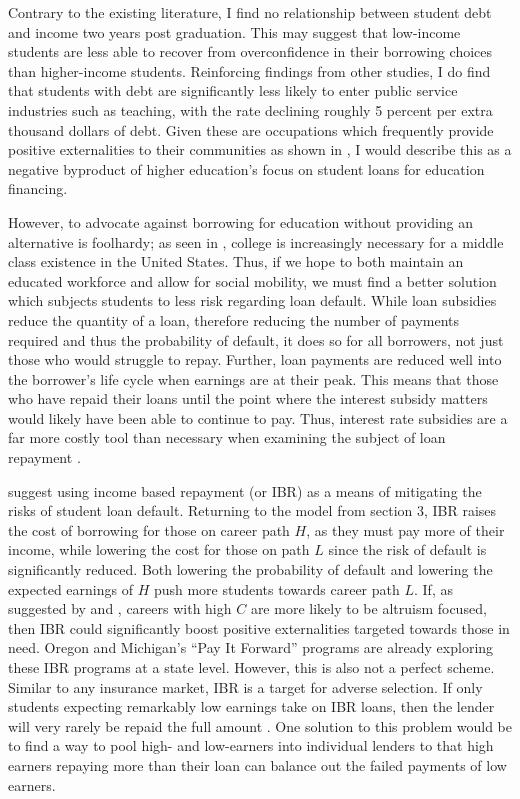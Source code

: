 \documentclass[12pt]{article}
\begin{document}
	Contrary to the existing literature, I find no relationship between student debt and income two years post graduation. This may suggest that low-income students are less able to recover from overconfidence in their borrowing choices than higher-income students. Reinforcing findings from other studies, I do find that students with debt are significantly less likely to enter public service industries such as teaching, with the rate declining roughly 5 percent per extra thousand dollars of debt. Given these are occupations which frequently provide positive externalities to their communities as shown in \textcite{benshem1991}, I would describe this as a negative byproduct of higher education's focus on student loans for education financing.
	
	However, to advocate against borrowing for education without providing an alternative is foolhardy; as seen in \textcite{abel2014}, college is increasingly necessary for a middle class existence in the United States. Thus, if we hope to both maintain an educated workforce and allow for social mobility, we must find a better solution which subjects students to less risk regarding loan default. While loan subsidies reduce the quantity of a loan, therefore reducing the number of payments required and thus the probability of default, it does so for all borrowers, not just those who would struggle to repay. Further, loan payments are reduced well into the borrower's life cycle when earnings are at their peak. This means that those who have repaid their loans until the point where the interest subsidy matters would likely have been able to continue to pay. Thus, interest rate subsidies are a far more costly tool than necessary when examining the subject of loan repayment \parencite{dynarski2015}.
	
	\textcite{abraham2018} suggest using income based repayment (or IBR) as a means of mitigating the risks of student loan default. Returning to the model from section 3, IBR raises the cost of borrowing for those on career path $H$, as they must pay more of their income, while lowering the cost for those on path $L$ since the risk of default is significantly reduced. Both lowering the probability of default and lowering the expected earnings of $H$ push more students towards career path $L$. If, as suggested by \textcite{benshem1991} and \textcite{hanson1995}, careers with high $C$ are more likely to be altruism focused, then IBR could significantly boost positive externalities targeted towards those in need.  Oregon and Michigan's ``Pay It Forward'' programs are already exploring these IBR programs at a state level. However, this is also not a perfect scheme. Similar to any insurance market, IBR is a target for adverse selection. If only students expecting remarkably low earnings take on IBR loans, then the lender will very rarely be repaid the full amount \parencite{dynarski2015}. One solution to this problem would be to find a way to pool high- and low-earners into individual lenders to that high earners repaying more than their loan can balance out the failed payments of low earners.
	
\end{document}
